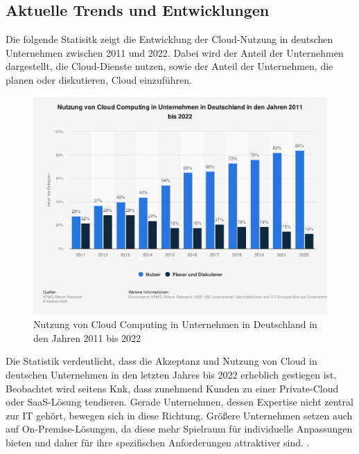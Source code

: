 \documentclass[12pt,bibtotoc]{article}
\begin{document}
			\subsection{Aktuelle Trends und Entwicklungen}
			Die folgende Statisitk zeigt die Entwicklung der Cloud-Nutzung in deutschen Unternehmen zwischen 2011 und 2022.
			Dabei wird der Anteil der Unternehmen dargestellt, die Cloud-Dienste nutzen, sowie der Anteil der Unternehmen, die planen oder diskutieren, Cloud einzuführen. 
			\begin{figure}[H] %
				\centering
				\includegraphics[keepaspectratio,width=\textwidth,height=\textheight]{"Content/Pictures/Nutzung von Cloud Computing in Unternehmen in Deutschland in den Jahren 2011 bis 2022.png"} 
				\renewcommand{\figurename}{Abb.}
				\caption{\small Nutzung von Cloud Computing in Unternehmen in Deutschland in den Jahren 2011 bis 2022}
			\end{figure}
			Die Statistik verdeutlicht, dass die Akzeptanz und Nutzung von Cloud in deutschen Unternehmen in den letzten Jahres bis 2022 erheblich gestiegen ist. 
			Beobachtet wird seitens Knk, dass zunehmend Kunden zu einer Private-Cloud oder SaaS-Lösung tendieren. Gerade Unternehmen, dessen Expertise nicht zentral zur IT gehört, bewegen sich in diese Richtung.
			Größere Unternehmen setzen auch auf On-Premise-Lösungen, da diese mehr Spielraum für individuelle Anpassungen bieten und daher für ihre spezifischen Anforderungen attraktiver sind. \cite{Anhang}.
			\newpage
\end{document}
